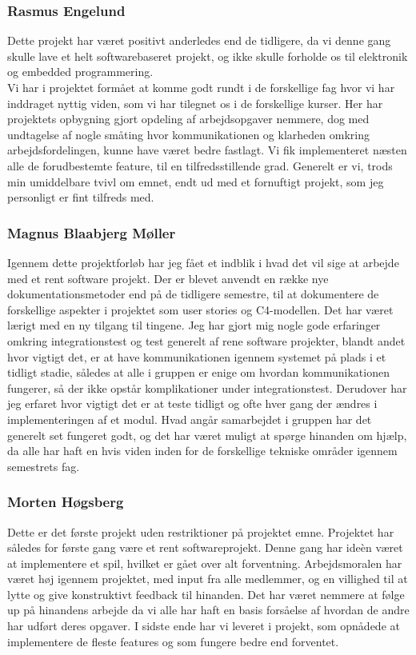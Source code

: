 \subsubsection{Rasmus Engelund}
Dette projekt har været positivt anderledes end de tidligere, da vi denne gang skulle lave et helt softwarebaseret projekt, og ikke skulle forholde os til elektronik og embedded programmering.\\
Vi har i projektet formået at komme godt rundt i de forskellige fag hvor vi har inddraget nyttig viden, som vi har tilegnet os i de forskellige kurser. Her har projektets opbygning gjort opdeling af arbejdsopgaver nemmere, dog med undtagelse af nogle småting hvor kommunikationen og klarheden omkring arbejdsfordelingen, kunne have været bedre fastlagt.
Vi fik implementeret næsten alle de forudbestemte feature, til en tilfredsstillende grad.
Generelt er vi, trods min umiddelbare tvivl om emnet, endt ud med et fornuftigt projekt, som jeg personligt er fint tilfreds med. 

\subsubsection{Magnus Blaabjerg Møller}
Igennem dette projektforløb har jeg fået et indblik i hvad det vil sige at arbejde med et rent software projekt. Der er blevet anvendt en række nye dokumentationsmetoder end på de tidligere semestre, til at dokumentere de forskellige aspekter i projektet som user stories og C4-modellen. Det har været lærigt med en ny tilgang til tingene. Jeg har gjort mig nogle gode erfaringer omkring integrationstest og test generelt af rene software projekter, blandt andet hvor vigtigt det, er at have kommunikationen igennem systemet på plads i et tidligt stadie, således at alle i gruppen er enige om hvordan kommunikationen fungerer, så der ikke opstår komplikationer under integrationstest. Derudover har jeg erfaret hvor vigtigt det er at teste tidligt og ofte hver gang der ændres i implementeringen af et modul. Hvad angår samarbejdet i gruppen har det generelt set fungeret godt, og det har været muligt at spørge hinanden om hjælp, da alle har haft en hvis viden inden for de forskellige tekniske områder igennem semestrets fag.\\

\subsubsection{Morten Høgsberg}
Dette er det første projekt uden restriktioner på projektet emne. Projektet har således for første gang
være et rent softwareprojekt. Denne gang har ideèn været at implementere et spil, hvilket er gået over
alt forventning. Arbejdsmoralen har været høj igennem projektet, med input fra alle medlemmer, og en
villighed til at lytte og give konstruktivt feedback til hinanden.
Det har været nemmere at følge up på hinandens arbejde da vi alle har haft en basis forsåelse af hvordan 
de andre har udført deres opgaver. I sidste ende har vi leveret i projekt, som opnådede at implementere
de fleste features og som fungere bedre end forventet. 

